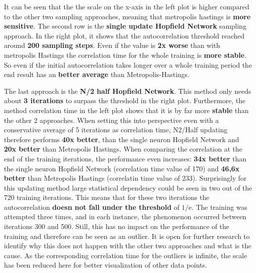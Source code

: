 It can be seen that the the scale on the x-axis in the left plot is higher compared to the other two sampling approaches, 
meaning that metropolis hastings is \textbf{more sensitive}. 
The second row is the \textbf{single update Hopfield Network} sampling approach. 
In the right plot, it shows that the autocorrelation threshold reached around \textbf{200 sampling steps}.
Even if the value is \textbf{2x worse} than with metropolis Hastings the correlation time for the whole training is \textbf{more stable}.
So even if the initial autocorrelation takes longer over a whole training period the end result has an \textbf{better average} than Metropolis-Hastings.

The last approach is the \textbf{N/2 half Hopfield Network}. 
This method only needs about \textbf{3 iterations} to surpass the threshold in the right plot.
Furthermore, the method correlation time in the left plot shows that it is by far more \textbf{stable} than the other 2 approaches.
When setting this into perspective even with a conservative average of 5 iterations as correlation time, N2/Half updating therefore
performs \textbf{40x better}, than the single neuron Hopfield Network and \textbf{20x better} than Metropolis Hastings.
When comparing the correlation at the end of the training iterations, the performance even increases: \textbf{34x better} than the single neuron Hopfield Network (correlation time value of 170) and \textbf{46,6x better} than Metropolis Hastings (correlatin time value of 233).
Surprisingly for this updating method large statistical dependency could be seen in two out of the 720 training iterations.
This means that for these two iterations the autocorrelation \textbf{doesn not fall under the threshold} of \(1/\mathrm{e}\).
The training was attempted three times, and in each instance, the phenomenon occurred between iterations 300 and 500.
Still, this has no impact on the performance of the training and therefore can be seen as an outlier.
It is open for further research to identify why this does not happen with the other two approaches and what is the cause.
As the corresponding correlation time for the outliers is infinite, the scale has been reduced here for better visualization of other data points.

